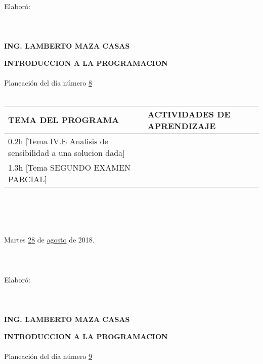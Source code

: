 \documentclass[landscape]{article}
\begin{document}
{\begin{center}
\ \\
Elabor\'o:
\ \\
\ \\
\ \\
\ \\
{\bf ING. LAMBERTO MAZA CASAS}
\end{center}
\eject
\begin{center}
{\bf 
INTRODUCCION A LA PROGRAMACION
}
\ \\
\ \\
Planeaci\'on del d\'ia n\'umero \underline{\hspace{0.5cm}8\hspace{0.5cm}}
\ \\
\ \\
\begin{tabular}{|p{11cm}|p{8cm}|}\hline
{\bf TEMA DEL PROGRAMA}&{\bf ACTIVIDADES DE APRENDIZAJE}\\\hline
	0.2h	[Tema IV.E Analisis de sensibilidad a una solucion dada]
&\\
	1.3h	[Tema SEGUNDO EXAMEN PARCIAL]
&\\
\hline
\end{tabular}
\ \\
\ \\
\ \\
\ \\
Martes \underline{\hspace{0.5cm}28\hspace{0.5cm}} de  \underline{\hspace{0.5cm}agosto\hspace{0.5cm}} de 2018.
\ \\
\ \\
\ \\
\ \\
Elabor\'o:
\ \\
\ \\
\ \\
\ \\
{\bf ING. LAMBERTO MAZA CASAS}
\end{center}
\eject
\begin{center}
{\bf 
INTRODUCCION A LA PROGRAMACION
}
\ \\
\ \\
Planeaci\'on del d\'ia n\'umero \underline{\hspace{0.5cm}9\hspace{0.5cm}}
\ \\
\ \\
\begin{tabular}{|p{11cm}|p{8cm}|}\hline

\end{tabular}
\end{center}}
\end{document}
